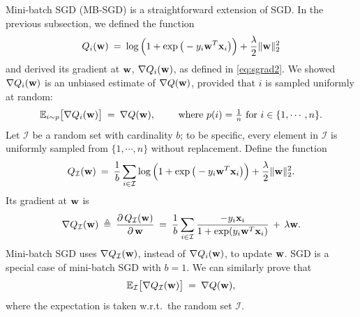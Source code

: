\documentclass[11pt]{article}
\numberwithin{equation}{section}
\def\w{{\bf w}}
\def\x{{\bf x}}
\def\IM{{\mathcal I}}
\def\EB{{\mathbb E}}
\begin{document}
Mini-batch SGD (MB-SGD) is a straightforward extension of SGD.
In the previous subsection, we defined the function
\begin{equation*}
Q_i (\w) \: = \: \log \Big( 1 + \exp \big( - y_i \w^T \x_i \big) \Big) + \frac{\lambda}{2} \|\w \|_2^2 
\end{equation*}
and derived its gradient at $\w$, $\nabla Q_i (\w)$, as defined in \eqref{eq:sgrad2}.
We showed $\nabla Q_i (\w)$ is an unbiased estimate of $\nabla Q (\w)$, provided that $i$ is sampled uniformly at random:
\begin{equation*}
\EB_{i\sim p} \big[ \nabla Q_i (\w) \big]
\: = \: \nabla Q (\w) ,
\qquad \textrm{ where } p(i) = \tfrac{1}{n} \textrm{ for } i \in \{1, \cdots , n \} .
\end{equation*}
Let $\IM$ be a random set with cardinality $b$;
to be specific, every element in $\IM$ is uniformly sampled from $\{1, \cdots , n \}$ without replacement.
Define the function
\begin{equation*}
Q_{\IM} (\w) \: = \: \frac{1}{b} \sum_{i \in \IM} \log \Big( 1 + \exp \big( - y_i \w^T \x_i \big) \Big) + \frac{\lambda}{2} \|\w \|_2^2 .
\end{equation*}
Its gradient at $\w$ is
\begin{equation} \label{eq:mb_grad}
\nabla Q_{\IM} (\w) \: \triangleq \:
\frac{ \partial \, Q_{\IM} (\w ) }{\partial \, \w }
\: = \:
\frac{1}{b} \sum_{i \in \IM}  \frac{ - y_i \x_i }{1+\exp({y_i \w^T \x_i})} \, + \, \lambda \w .
\end{equation}
Mini-batch SGD uses $\nabla Q_{\IM} (\w)$, instead of $\nabla Q_i (\w)$, to update $\w$.
SGD is a special case of mini-batch SGD with $b=1$.
We can similarly prove that
\begin{equation*}
\EB_{\IM } \big[ \nabla Q_{\IM} (\w) \big]
\: = \: \nabla Q (\w) ,
\end{equation*}
where the expectation is taken w.r.t.\ the random set $\IM$.
\end{document}
